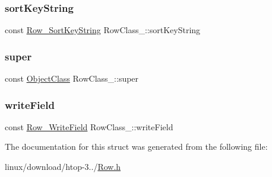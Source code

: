 \subsubsection{\texorpdfstring{sort\+Key\+String}{sortKeyString}}
{\footnotesize\ttfamily const \hyperlink{Row_8h_a5038da65a10191f16604a8a23592762d}{Row\+\_\+\+Sort\+Key\+String} Row\+Class\+\_\+\+::sort\+Key\+String}

\mbox{\label{structRowClass___a30ab15f272d4a17e39fb5ffcf30e4fa3}} 
\subsubsection{\texorpdfstring{super}{super}}
{\footnotesize\ttfamily const \hyperlink{Object_8h_a6feb151c3b8f61fae503dfbcdc3d6a54}{Object\+Class} Row\+Class\+\_\+\+::super}

\mbox{\label{structRowClass___acdc5cbb4697d54a502e5da2eec0d9aa6}} 
\subsubsection{\texorpdfstring{write\+Field}{writeField}}
{\footnotesize\ttfamily const \hyperlink{Row_8h_a89f55adea231414c3e16986d1ae5bdf0}{Row\+\_\+\+Write\+Field} Row\+Class\+\_\+\+::write\+Field}



The documentation for this struct was generated from the following file\+:\begin{DoxyCompactItemize}
\item 
linux/download/htop-\/3../\hyperlink{Row_8h}{Row.\+h}\end{DoxyCompactItemize}
